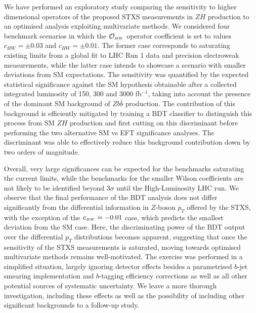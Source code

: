 We have performed an exploratory study comparing the sensitivity to higher dimensional operators of the proposed STXS measurements in $ZH$ production to an optimised analysis exploiting multivariate methods. We considered four benchmark scenarios in which the $\mathcal{O}_{\scriptscriptstyle HW}$ operator coefficient is set to values $c_{HW}=\pm 0.03$ and $c_{HW}=\pm 0.01$. The former case corresponds to saturating existing limits from a global fit to LHC Run 1 data and precision electroweak measurements, while the latter case intends to showcase a scenario with smaller deviations from SM expectations. The sensitivity was quantified by the expected statistical significance against the SM hypothesis obtainable after a collected integrated luminosity of 150, 300 and 3000 fb$^{-1}$, taking into account the presence of the dominant SM background of $Zb\bar{b}$ production. The contribution of this background is efficiently mitigated by training a BDT classifier to distinguish this process from SM $ZH$ production and first cutting on this discriminant before performing the two alternative SM vs EFT significance analyses. The discriminant was able to effectively reduce this background contribution down by two orders of magnitude.

Overall, very large significances can be expected for the benchmarks saturating the current limits, while the benchmarks for the smaller Wilson coefficients are not likely to be identified beyond 3$\sigma$ until the High-Luminosity LHC run. We observe that the final performance of the BDT analysis does not differ significantly from the differential information in $Z$-boson $p_T$ offered by the STXS, with the exception of the $c_{\scriptscriptstyle HW}=-0.01$ case, which predicts the smallest deviation from the SM case. Here, the discriminating power of the BDT output over the differential $p_T$ distributions becomes apparent, suggesting that once the sensitivity of the STXS measurements is saturated, moving towards optimised multivariate methods remains well-motivated. The exercise was performed in a simplified situation, largely ignoring detector effects besides a parametrised $b$-jet smearing implementation and $b$-tagging efficiency corrections as well as all other potential sources of systematic uncertainty. We leave a more thorough investigation, including these effects as well as the possibility of including other significant backgrounds to a follow-up study. 

